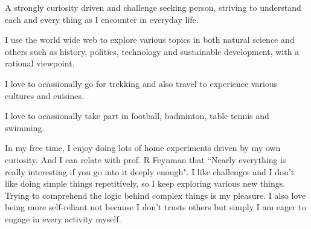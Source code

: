 {}

A strongly curiosity driven and challenge seeking person, striving to understand each and every thing as I encounter in everyday life. 

I use the world wide web to explore various topics in both natural science and others such as history, politics, technology and sustainable development, with a rational viewpoint.

I love to ocassionally go for trekking and also travel to experience various cultures and cuisines.

I love to ocassionally take part in football, badminton, table tennis and swimming. 

In my free time, I enjoy doing lots of home experiments driven by my own curiosity. And I can relate with prof. R Feynman that ``Nearly everything is really interesting if you go into it deeply enough". 
I like challenges and I don't like doing simple things repetitively, so I keep exploring various new things. Trying to comprehend the logic behind complex things is my pleasure.
I also love being more self-reliant not because I don't trusts others but simply I am eager to engage in every activity myself.





